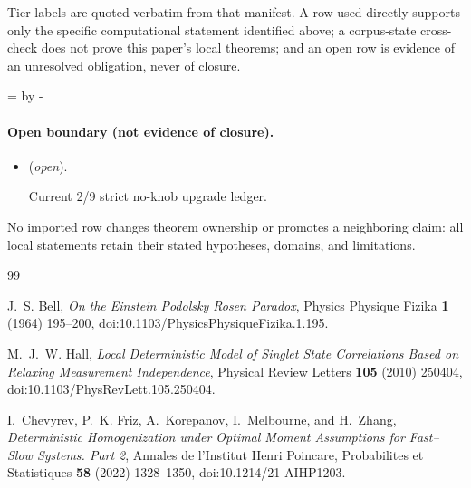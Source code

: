 \documentclass[11pt]{article}
\begin{document}
Tier labels are quoted verbatim from that manifest. A row used directly supports only the specific computational statement identified above; a corpus-state cross-check does not prove this paper's local theorems; and an open row is evidence of an unresolved obligation, never of closure.

\par\begingroup{}=\pagegoal\advance{} by -\pagetotal\ifdim\dimen0<7\baselineskip\newpage\fi\endgroup
\paragraph{Open boundary (not evidence of closure).}
\begin{itemize}
\setlength{\itemsep}{0.25em}
\item {} (\emph{open}).\par Current 2/9 strict no-knob upgrade ledger.
\end{itemize}

No imported row changes theorem ownership or promotes a neighboring claim: all local statements retain their stated hypotheses, domains, and limitations.

\begin{thebibliography}{99}

J.~S. Bell,
\emph{On the Einstein Podolsky Rosen Paradox},
Physics Physique Fizika \textbf{1} (1964) 195--200,
doi:10.1103/PhysicsPhysiqueFizika.1.195.

M.~J.~W. Hall,
\emph{Local Deterministic Model of Singlet State Correlations Based on
Relaxing Measurement Independence},
Physical Review Letters \textbf{105} (2010) 250404,
doi:10.1103/PhysRevLett.105.250404.

I.~Chevyrev, P.~K. Friz, A.~Korepanov, I.~Melbourne, and H.~Zhang,
\emph{Deterministic Homogenization under Optimal Moment Assumptions for
Fast--Slow Systems. Part 2},
Annales de l'Institut Henri Poincare, Probabilites et Statistiques
\textbf{58} (2022) 1328--1350,
doi:10.1214/21-AIHP1203.

\end{thebibliography}
\end{document}
